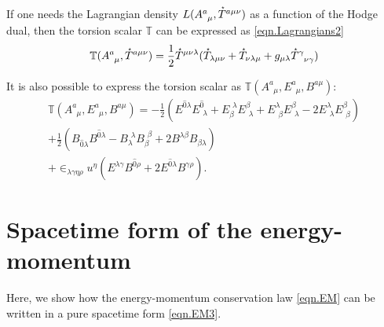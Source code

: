 \documentclass[
10pt, %
a4paper, %
oneside, %
headinclude,footinclude, %
BCOR5mm, %
]{scrartcl}
\newcommand{\tetr}[2]{A^{#1}_{\phantom{#1}#2}}
\newcommand{\ET}[2]{E^{#1}_{\phantom{#1}#2}}	%
\newcommand{\ETmix}[2]{E^{#1}_{#2}}	%
\newcommand{\BT}[2]{B^{#1#2}}	%
\newcommand{\BTmix}[2]{B^{#1}_{#2}}	%
\newcommand{\Laghodge}{L}%
\newcommand{\LCsymb}{\bm{\in}}    %
\newcommand{\HDT}[1]{\accentset{\star}{T}^{#1}}
\newcommand{\HDmix}{\accentset{\star}{T}}
\newcommand{\Tscal}{\mathbb{T}}		%
\begin{document}
If one needs the Lagrangian density $ \Laghodge(\tetr{a}{\mu},\HDT{a\mu\nu}) $ as a function of the 
Hodge dual, then the torsion scalar $ \Tscal $ can be expressed as
\eqref{eqn.Lagrangians2}
\begin{equation}\label{eqn.Tscal.Hodge}
	\Tscal(\tetr{a}{\mu},\HDT{a\mu\nu}) = \frac12 \HDT{\mu\nu\lambda} (\HDmix_{\lambda\mu\nu} + 
	\HDmix_{\nu\lambda\mu} + g_{\mu\lambda} \HDmix^{\gamma}_{\phantom{\gamma\,} \nu\gamma})
\end{equation}


It is also possible to express the torsion scalar as $ 
\Tscal(\tetr{a}{\mu},\ET{a}{\mu},\BT{a}{\mu}) $:
\begin{multline}\label{eqn.Tscal.EB}
	\Tscal(\tetr{a}{\mu},\ET{a}{\mu},\BT{a}{\mu}) = 
	-\frac12 (\ETmix{\hat{0}\lambda}{}\ETmix{\hat{0}}{\ \,\lambda}   +
		      \ETmix{\ \,\lambda}{\beta} \ETmix{\beta}{\ \,\lambda}  +
			  \ETmix{\lambda}{\ \,\beta}\ETmix{\beta}{\ \,\lambda}   -
			  2\ETmix{\lambda}{\ \,\lambda}\ETmix{\beta}{\ \,\beta} )
			  \\
	+ \frac12 (  \BTmix{}{\hat{0}\lambda}\BTmix{\hat{0}\lambda}{}
	           - \BTmix{\ \,\lambda}{\lambda}\BTmix{\ \,\beta}{\beta}
	           + 2\BTmix{\lambda\beta}{}\BTmix{}{\beta\lambda}
	           )
	          \\
	          + \LCsymb_{\lambda\gamma\eta\rho} u^\eta 
	          (\ETmix{\lambda\gamma}{}\BTmix{\hat{0}\rho}{} + 2 
	          \ET{\hat{0}\lambda}{}\BTmix{\gamma\rho}{}).
\end{multline}


\appendix


\section{Spacetime form of the energy-momentum}\label{app.sec.EM}

Here, we show how the energy-momentum conservation law \eqref{eqn.EM} can be written in a pure 
spacetime form \eqref{eqn.EM3}.
\end{document}
